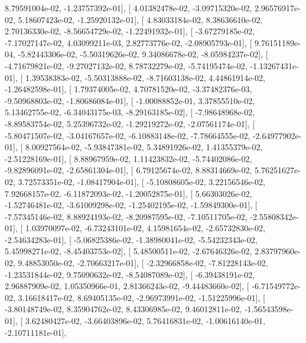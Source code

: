 \documentclass{article}
\begin{document}
          8.79591004e-02,  -1.23757392e-01],
       [  4.01382478e-02,  -3.09715320e-02,   2.96576917e-02,
          5.18607423e-02,  -1.25920132e-01],
       [  4.83033184e-02,   8.38636610e-02,   2.70136330e-02,
         -8.56654729e-02,  -1.22491932e-01],
       [ -3.67279185e-02,  -7.17027147e-02,   4.03099211e-03,
          2.82773776e-02,  -2.08905793e-01],
       [  9.76151189e-04,  -5.82443306e-02,  -5.50319626e-02,
          9.34086678e-02,  -8.05984237e-02],
       [ -4.71679821e-02,  -9.27027132e-02,   8.78732279e-02,
         -5.74195474e-02,  -1.13267431e-01],
       [  1.39538383e-02,  -5.50313888e-02,  -8.71603138e-02,
          4.44861914e-02,  -1.26482598e-01],
       [  1.79374005e-02,   4.70781520e-02,  -3.37482376e-03,
         -9.50968803e-02,  -1.80686084e-01],
       [ -1.00088852e-01,   3.37855510e-02,   5.13462755e-02,
         -6.34043175e-03,  -8.29163185e-02],
       [ -7.98648968e-02,  -8.89583754e-02,   5.25396732e-02,
         -1.29219272e-02,  -2.07561174e-01],
       [ -5.80471507e-02,  -3.04167657e-02,  -6.10883148e-02,
         -7.78664555e-02,  -2.64977902e-01],
       [  8.00927564e-02,  -5.93847381e-02,   5.34891926e-02,
          1.41355379e-02,  -2.51228169e-01],
       [  8.88967959e-02,   1.11423832e-02,  -5.74402086e-02,
         -9.82896091e-02,  -2.65861304e-01],
       [  6.79125674e-02,   8.88314669e-02,   5.76251627e-02,
          3.72573351e-02,  -1.08417904e-01],
       [ -5.10808605e-02,   3.22156546e-02,   7.92668157e-02,
         -6.11872093e-02,  -1.20052875e-01],
       [  5.66303026e-02,  -1.52746481e-02,  -3.61009298e-02,
         -1.25402195e-02,  -1.59849300e-01],
       [ -7.57345146e-02,   8.88924193e-02,  -8.20987595e-02,
         -7.10511705e-02,  -2.55808342e-01],
       [  1.03970097e-02,  -6.73243101e-02,   4.15981654e-02,
         -2.65732830e-02,  -2.54634283e-01],
       [ -5.06825386e-02,  -1.38980041e-02,  -5.54232343e-02,
          5.45998271e-02,  -8.45403753e-02],
       [  5.48500511e-02,  -2.67646326e-02,   2.83797960e-02,
          9.48853050e-02,  -2.70663217e-01],
       [ -2.32966858e-02,  -7.81228143e-02,  -1.23531844e-02,
          9.75090632e-02,  -8.54087089e-02],
       [ -6.39438191e-02,   2.96887909e-02,   1.05350966e-01,
          2.81366243e-02,  -9.44483660e-02],
       [ -6.71549772e-02,   3.16618417e-02,   8.69405135e-02,
         -2.96973991e-02,  -1.51225996e-01],
       [ -3.80148749e-02,   8.35904762e-02,   8.43306985e-02,
          9.46012811e-02,  -1.56543598e-01],
       [  3.62480427e-02,  -3.66403896e-02,   5.76416831e-02,
         -1.00616140e-01,  -2.10711181e-01],
\end{document}
